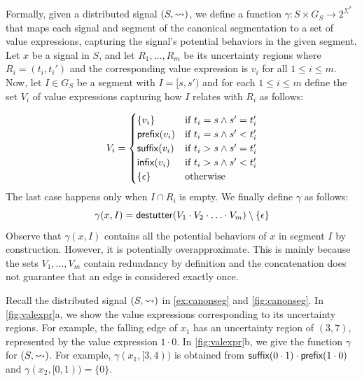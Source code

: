 Formally, given a distributed signal $(S,{\rightsquigarrow})$, we define a function $\gamma : S \times G_S \to 2^{\Sigma^*}$ that maps each signal and segment of the canonical segmentation to a set of value expressions, capturing the signal's potential behaviors in the given segment.
Let $x$ be a signal in $S$, and let $R_1, \ldots, R_m$ be its uncertainty regions where $R_i = (t_i, t_i')$ and the corresponding value expression is $v_i$ for all $1 \leq i \leq m$.
Now, let $I \in G_S$ be a segment with $I = [s, s')$ and for each $1 \leq i \leq m$ define the set $V_i$ of value expressions capturing how $I$ relates with $R_i$ as follows:

\small
\begin{equation*}
	V_i = 
	\begin{cases}
		\{v_i\} & \text{if } t_i = s \land s' = t_i' \\
		\textsf{prefix}(v_i) & \text{if } t_i = s \land s' < t_i' \\
		\textsf{suffix}(v_i) & \text{if } t_i > s \land s' = t_i' \\
		\textsf{infix}(v_i) & \text{if } t_i > s \land s' < t_i' \\
		\{\epsilon\} & \text{otherwise}
	\end{cases}
\end{equation*}
\normalsize
The last case happens only when $I \cap R_i$ is empty.
We finally define $\gamma$ as follows:
\[ \gamma(x,I) = \mathsf{destutter}(V_1 \cdot V_2 \cdot \ldots \cdot V_m) \setminus \{\epsilon\} \]
Observe that $\gamma(x,I)$ contains all the potential behaviors of $x$ in segment $I$ by construction.
However, it is potentially overapproximate.
This is mainly because the sets $V_1, \ldots, V_m$ contain redundancy by definition and the concatenation does not guarantee that an edge is considered exactly once.

\begin{example} \label{ex:valexpr}
	Recall the distributed signal $(S, {\rightsquigarrow})$ in \cref{ex:canonseg} and \cref{fig:canonseg}.
	In \cref{fig:valexpr}a, we show the value expressions corresponding to its uncertainty regions.
	For example, the falling edge of $x_1$ has an uncertainty region of $(3,7)$, represented by the value expression $1 \cdot 0$.
	In \cref{fig:valexpr}b, we give the function $\gamma$ for $(S, {\rightsquigarrow})$.
	For example, $\gamma(x_1, [3,4))$ is obtained from $\textsf{suffix}(0 \cdot 1) \cdot \textsf{prefix}(1 \cdot 0)$ and $\gamma(x_2, [0,1)) = \{0\}$.
\end{example}


